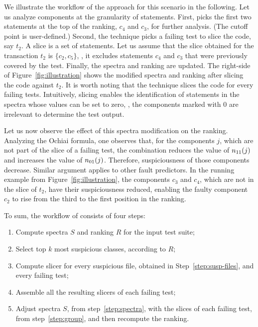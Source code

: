 \documentclass{article}
\begin{document}
We illustrate the workflow of the \comb{} approach for this scenario
in the following. Let us analyze components at the granularity of
statements.  First, \comb{} picks the first two statements at the top
of the ranking, $c_4$ and $c_3$, for further analysis.  (The cutoff
point is user-defined.) Second, the technique picks a failing test to
slice the code, say $t_2$. A slice is a set of statements. Let us
assume that the slice obtained for the transaction $t_2$ is $\{c_2,
c_5\}$, \ie, it excludes statements $c_4$ and $c_3$ that were
previously covered by the test. Finally, the spectra and ranking are
updated. The right-side of Figure~\ref{fig:illustration} shows the
modified spectra and ranking after slicing the code against $t_2$. It
is worth noting that the technique slices the code for every failing
tests. Intuitively, slicing enables the identification of statements
in the spectra whose values can be set to zero, \ie{}, the components
marked with $0$ are irrelevant to determine the test output.

Let us now observe the effect of this spectra modification on the
ranking. Analyzing the Ochiai formula, one observes that, for the
components $j$, which are not part of the slice of a failing test, the
combination reduces the value of $n_{11}(j)$ and increases the value of
$n_{01}(j)$. Therefore, suspiciousness of those components
decrease. Similar argument applies to other fault predictors. In the
running example from Figure~\ref{fig:illustration}, the components
$c_3$ and $c_4$, which are not in the slice of $t_2$, have their
suspiciousness reduced, enabling the faulty component $c_2$ to rise
from the third to the first position in the ranking.

\vspace{1ex}
To sum, the workflow of \comb{} consists of four steps:
\begin{enumerate}
  \itemsep0em
  \item\label{step:spectra} Compute spectra $S$ and ranking $R$ for
  the input test suite;
  \item\label{step:susp-files} Select top $k$ most suspicious classes, according to $R$;
  \item\label{step:compute-slice} Compute slicer for every suspicious
    file, obtained in Step~\ref{step:susp-files}, and every failing test;
  \item\label{step:group} Assemble all the resulting slicers of each failing test;
  \item Adjust spectra $S$, from step~\ref{step:spectra}, with
    the slices of each failing test, from
    step~\ref{step:group}, and then
	recompute the ranking.
\end{enumerate}
\end{document}
